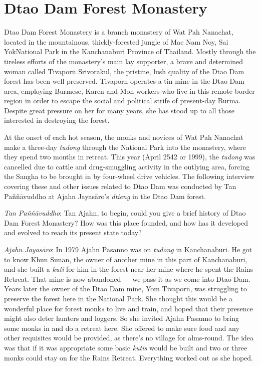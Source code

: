 

\chapter{Dtao Dam Forest Monastery}
\markright{\chapterAuthor}

Dtao Dam Forest Monastery is a branch monastery of Wat Pah Nanachat,
located in the mountainous, thickly-forested jungle of Mae Nam Noy, Sai
YokNational Park in the Kanchanaburi Province of Thailand. Mostly
through the tireless efforts of the monastery's main lay supporter, a
brave and determined woman called Tivaporn Srivorakul, the pristine,
lush quality of the Dtao Dam forest has been well preserved. Tivaporn
operates a tin mine in the Dtao Dam area, employing Burmese, Karen and
Mon workers who live in this remote border region in order to escape the
social and political strife of present-day Burma. Despite great pressure
on her for many years, she has stood up to all those interested in
destroying the forest.

At the onset of each hot season, the monks and novices of Wat Pah
Nanachat make a three-day \emph{tudong} through the National Park into
the monastery, where they spend two months in retreat. This year (April
2542 or 1999), the \emph{tudong} was cancelled due to cattle and
drug-smuggling activity in the outlying area, forcing the Sangha to be
brought in by four-wheel drive vehicles. The following interview
covering these and other issues related to Dtao Dam was conducted by Tan
Paññāvuddho at Ajahn Jayasāro's \emph{dtieng} in the Dtao Dam forest.

\emph{Tan Paññāvuddho}: Tan Ajahn, to begin, could you give a brief
history of Dtao Dam Forest Monastery? How was this place founded, and
how has it developed and evolved to reach its present state today?

\emph{Ajahn Jayasāro}: In 1979 Ajahn Pasanno was on \emph{tudong} in
Kanchanaburi. He got to know Khun Sunan, the owner of another mine in
this part of Kanchanaburi, and she built a \emph{kuti} for him in the
forest near her mine where he spent the Rains Retreat. That mine is now
abandoned --- we pass it as we come into Dtao Dam. Years later the owner
of the Dtao Dam mine, Yom Tivaporn, was struggling to preserve the
forest here in the National Park. She thought this would be a wonderful
place for forest monk\emph{s} to live and train, and hoped that their
presence might also deter hunters and loggers. So she invited Ajahn
Pasanno to bring some monks in and do a retreat here. She offered to
make sure food and any other requisites would be provided, as there's no
village for alms-round. The idea was that if it was appropriate some
basic \emph{kutis} would be built and two or three monks could stay on
for the Rains Retreat. Everything worked out as she hoped.

